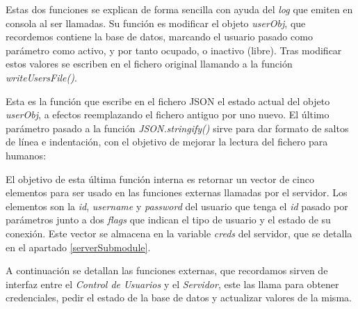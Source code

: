 Estas dos funciones se explican de forma sencilla con ayuda del \emph{log} que emiten en consola al ser llamadas. Su función es modificar el objeto \emph{userObj}, que recordemos contiene la base de datos, marcando el usuario pasado como parámetro como activo, y por tanto ocupado, o inactivo (libre). Tras modificar estos valores se escriben en el fichero original llamando a la función \emph{writeUsersFile()}.


Esta es la función que escribe en el fichero JSON el estado actual del objeto \emph{userObj}, a efectos reemplazando el fichero antiguo por uno nuevo. El último parámetro pasado a la función \emph{JSON.stringify()} sirve para dar formato de saltos de línea e indentación, con el objetivo de mejorar la lectura del fichero para humanos:

\begin{listing}[H]
\begin{minted}
[
frame=lines,
framesep=2mm,
baselinestretch=1.2,
bgcolor=lightgray,
fontsize=\footnotesize,
breaklines=true,
breaksymbolleft={}
]
{javascript}
function prepareToConnect(userId) {
   return [userObj.users[userId].id, userObj.users[userId].username, userObj.users[userId].password, false, 0];
\end{verbatim}
\caption{Preparación de credenciales}
\end{listing}

El objetivo de esta última función interna es retornar un vector de cinco elementos para ser usado en las funciones externas llamadas por el servidor. Los elementos son la \emph{id}, \emph{username} y \emph{password} del usuario que tenga el \emph{id} pasado por parámetros junto a dos \emph{flags} que indican el tipo de usuario y el estado de su conexión. Este vector se almacena en la variable \emph{creds} del servidor, que se detalla en el apartado \ref{serverSubmodule}.

A continuación se detallan las funciones externas, que recordamos sirven de interfaz entre el \emph{Control de Usuarios} y el \emph{Servidor}, este las llama para obtener credenciales, pedir el estado de la base de datos y actualizar valores de la misma.

